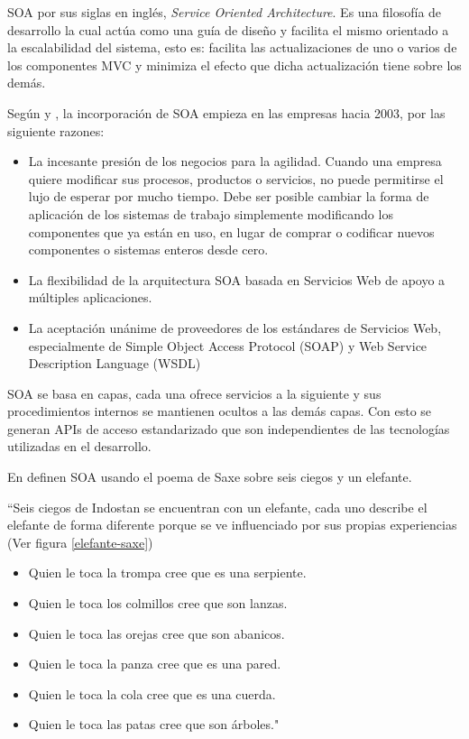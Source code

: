    SOA por sus siglas en inglés, \textit{Service Oriented Architecture}. Es una filosofía de desarrollo la cual actúa como una guía de diseño y facilita el mismo orientado a la escalabilidad del sistema, esto es: facilita las actualizaciones de uno o varios de los componentes MVC y minimiza el efecto que dicha actualización tiene sobre los demás.
    
    Según \citeauthor{SOA-libroGartner}\cite{SOA-libroGartner} y \citeauthor{SOA-tesis}\cite{SOA-tesis}, la incorporación de SOA empieza en las empresas hacia 2003, por las siguiente razones:
    
    \begin{itemize}
        \item La incesante presión de los negocios para la agilidad. Cuando una empresa quiere
        modificar sus procesos, productos o servicios, no puede permitirse el lujo de esperar por
        mucho tiempo. Debe ser posible cambiar la forma de aplicación de los sistemas de
        trabajo simplemente modificando los componentes que ya están en uso, en lugar de
        comprar o codificar nuevos componentes o sistemas enteros desde cero.
        
        \item La flexibilidad de la arquitectura SOA basada en Servicios Web de apoyo a múltiples
        aplicaciones.
        
        \item  La aceptación unánime de proveedores de los estándares de Servicios Web,
        especialmente de Simple Object Access Protocol (SOAP) y Web Service Description
        Language (WSDL)\cite{SOA-libroGartner}
        
    \end{itemize}
    
    SOA se basa en capas, cada una ofrece servicios a la siguiente y sus procedimientos internos se mantienen ocultos a las demás capas. Con esto se generan APIs de acceso estandarizado que son independientes de las tecnologías utilizadas en el desarrollo.
    
    En \cite{SOA-msdn} definen SOA usando el poema de Saxe sobre seis ciegos y un elefante.
    
    ``Seis ciegos de Indostan se encuentran con un elefante, cada uno describe el elefante de forma diferente porque se ve influenciado por sus propias experiencias (Ver figura \ref{elefante-saxe})
    
    \begin{itemize}
        \item Quien le toca la trompa cree que es una serpiente.
        \item Quien le toca los colmillos cree que son lanzas.
        \item Quien le toca las orejas cree que son abanicos.
        \item Quien le toca la panza cree que es una pared.
        \item Quien le toca la cola cree que es una cuerda.
        \item Quien le toca	las patas cree que son árboles."
    \end{itemize}
    

